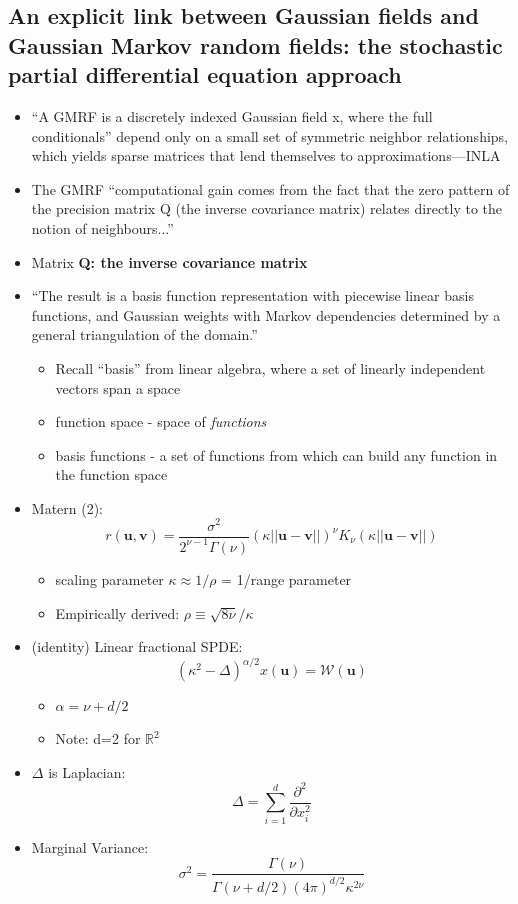 \documentclass{article}
\begin{document}
\subsection*{An explicit link between Gaussian fields and Gaussian Markov random fields: the stochastic partial differential equation approach \citep{Lindgren2011}}
\begin{itemize}
\item ``A GMRF is a discretely indexed Gaussian field x, where the full conditionals'' depend only on a small set of symmetric neighbor relationships, which yields sparse matrices that lend themselves to approximations---INLA
\item The GMRF ``computational gain comes from the fact that the zero pattern of the precision matrix Q (the inverse covariance matrix) relates directly to the notion of neighbours...''
\item Matrix {\bf Q: the inverse covariance matrix}
\item ``The result is a basis function representation with piecewise linear basis functions, and Gaussian weights with Markov dependencies determined by a general triangulation of the domain.'' 
  \begin{itemize}
  \item Recall ``basis'' from linear algebra, where a set of linearly independent vectors span a space
  \item function space - space of {\it functions}
  \item basis functions - a set of functions from which can build any function in the function space
  \end{itemize}

\item Matern (2):
$$r(\pmb{u}, \pmb{v}) = \frac{\sigma^{2}}{2^{\nu - 1}\Gamma(\nu)}(\kappa||\pmb{u} - \pmb{v}||)^{\nu}K_{\nu}(\kappa||\pmb{u} - \pmb{v}||)$$
      \begin{itemize}
      \item scaling parameter $\kappa \approx 1/\rho$ = 1/range parameter
      \item Empirically derived: $\rho \equiv \sqrt{8\nu}/\kappa$
      \end{itemize}
\item (identity) Linear fractional SPDE:
$$ (\kappa^{2} - \Delta)^{\alpha/2} x(\pmb{u}) = \mathcal{W}(\pmb{u}) $$
      \begin{itemize}
      \item $\alpha = \nu + d/2$ 
      \item Note: d=2 for $\mathbb{R}^{2}$
      \end{itemize}
\item $\Delta$ is Laplacian:
$$ \Delta = \sum_{i=1}^{d} \frac{\partial^{2}}{\partial x_{i}^{2}} $$
\item Marginal Variance:
$$\sigma^{2} = \frac{\Gamma(\nu)}{\Gamma(\nu + d/2)(4\pi)^{d/2}\kappa^{2\nu}}$$
\end{itemize}
\end{document}
